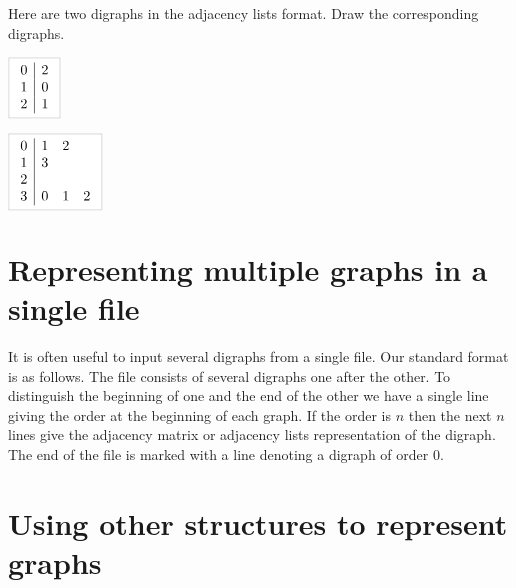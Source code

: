 \begin{Boxample}[1]
Here are two digraphs in the adjacency lists format.  Draw the corresponding digraphs.

\vspace{1cm}
$\lightgraybox{\begin{array}{c|c}
0 & 2  \\
1 & 0  \\
2 & 1 \\
\end{array}}$

\vspace{1.5cm}
$\lightgraybox{\begin{array}{c|ccc}
0 & 1 & 2  \\
1 & 3  \\
2  \\
3 & 0 & 1 & 2 \\
\end{array}}$
\end{Boxample}

\section{Representing multiple graphs in a single file}

It is often useful to input several digraphs from a single file. Our
standard format is as follows. The file consists of several digraphs 
one after the other. To distinguish the beginning of one and the end of
the other we have a single line giving the order at the beginning of
each graph. If the order is $n$ then the next $n$ lines give the
adjacency matrix or adjacency lists representation of the digraph. 
The end of the file is marked with a line denoting a digraph of order
$0$.



\section{Using other structures to represent graphs}

